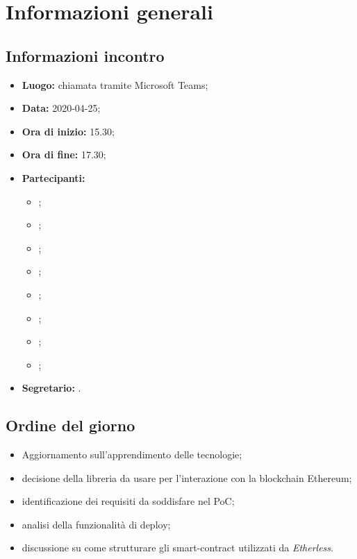 \section{Informazioni generali}
\subsection{Informazioni incontro}
\begin{itemize}
	\item \textbf{Luogo:} chiamata tramite Microsoft Teams; 
	\item \textbf{Data:} 2020-04-25;
	\item \textbf{Ora di inizio:} 15.30; 
	\item \textbf{Ora di fine:} 17.30; 
	\item \textbf{Partecipanti:}
		\begin{itemize}
			\item \VB; 
			\item \LB; 
			\item \NF; 
			\item \EG; 
			\item \FJ; 
			\item \MP; 
			\item \AS; 
			\item \AZ; 
		\end{itemize}
	\item \textbf{Segretario:} \EG. 
\end{itemize}

\subsection{Ordine del giorno}
\begin{itemize}
	\item Aggiornamento sull'apprendimento delle tecnologie; 
	\item decisione della libreria da usare per l'interazione con la blockchain Ethereum; 
	\item identificazione dei requisiti da soddisfare nel PoC; 
	\item analisi della funzionalità di deploy;
	\item discussione su come strutturare gli smart-contract utilizzati da \textit{Etherless}.
\end{itemize}
